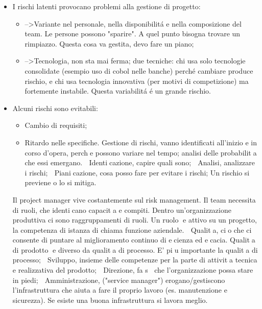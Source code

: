 \documentclass[10pt]{article}
\begin{document}
\begin{itemize}
\begin{itemize}
	\item I rischi latenti provocano problemi alla gestione di progetto:
	\begin{itemize}
		\item -->Variante nel personale, nella disponibilit\'a e nella 
		composizione del team. 
		Le persone possono	"sparire". A quel punto bisogna trovare un 
		rimpiazzo. Questa cosa va gestita, 
		devo fare un piano;
		
		\item -->Tecnologia, non sta mai ferma; due tecniche: chi usa solo 
		tecnologie consolidate (esempio uso di cobol nelle banche) perch\'e 
		cambiare produce rischio, e chi usa tecnologia 
		innovativa (per motivi di competizione) ma fortemente instabile. Questa 
		variabilit\'a \'e un grande rischio.
	\end{itemize}
		\item Alcuni rischi sono evitabili:
		\begin{itemize}
		\item Cambio di requisiti;
		\item Ritardo nelle specifiche.
		Gestione di rischi, vanno identificati all'inizio e in corso d'opera, 
		perche 
		possono variare nel tempo; analisi
		delle probabilita che essi emergano.
		 Identicazione, capire quali sono;
		 Analisi, analizzare i rischi;
		 Pianicazione, cosa posso fare per evitare i rischi;
		Un rischio si previene o lo si mitiga.
		
		\end{itemize}
		


Il project manager vive costantemente sul risk management.
Il team necessita di ruoli, che identicano capacita e compiti. Dentro 
un'organizzazione produttiva ci sono
raggruppamenti di ruoli. Un ruolo e attivo su un progetto, la competenza di 
istanza di chiama funzione
aziendale.
 Qualita, cio che ci consente di puntare al miglioramento continuo di 
ecienza ed ecacia. Qualita di
prodotto e diverso da qualita di processo. E' piu importante la qualita di 
processo;
 Sviluppo, insieme delle competenze per la parte di attivita tecnica e 
realizzativa del prodotto;
 Direzione, fa s che l'organizzazione possa stare in piedi;
 Amministrazione, ("service manager") erogano/gestiscono l'infrastruttura che 
aiuta a fare il proprio
lavoro (es. manutenzione e sicurezza). Se esiste una buona infrastruttura si 
lavora meglio.





\end{itemize}
\end{itemize}
\end{document}
